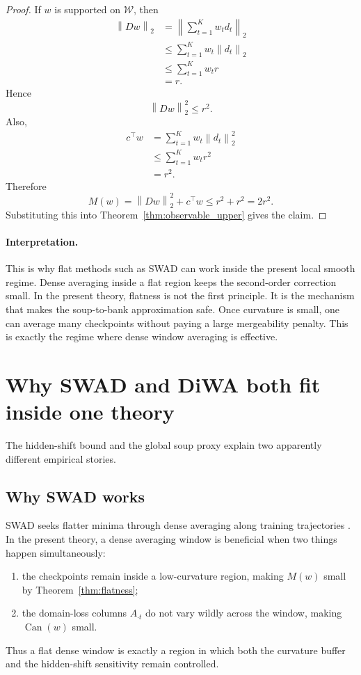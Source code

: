 \documentclass[11pt]{article}
\newcommand{\1}{\mathbf{1}}
\newcommand{\norm}[1]{\left\lVert #1 \right\rVert}
\theoremstyle{plain}
\theoremstyle{definition}
\theoremstyle{remark}
\begin{document}
\begin{proof}
If $w$ is supported on $\mathcal{W}$, then
\begin{align*}
\norm{Dw}_2
&= \norm{\sum_{t=1}^K w_t d_t}_2 \\
&\le \sum_{t=1}^K w_t \norm{d_t}_2 \\
&\le \sum_{t=1}^K w_t r \\
&= r.
\end{align*}
Hence
\[
\norm{Dw}_2^2 \le r^2.
\]
Also,
\begin{align*}
c^\top w
&= \sum_{t=1}^K w_t \norm{d_t}_2^2 \\
&\le \sum_{t=1}^K w_t r^2 \\
&= r^2.
\end{align*}
Therefore
\[
M(w) = \norm{Dw}_2^2 + c^\top w \le r^2 + r^2 = 2r^2.
\]
Substituting this into Theorem~\ref{thm:observable_upper} gives the claim.
\end{proof}

\paragraph{Interpretation.}
This is why flat methods such as SWAD can work inside the present local smooth regime. Dense averaging inside a flat region keeps the second-order correction small. In the present theory, flatness is not the first principle. It is the mechanism that makes the soup-to-bank approximation safe. Once curvature is small, one can average many checkpoints without paying a large mergeability penalty. This is exactly the regime where dense window averaging is effective.

\section{Why SWAD and DiWA both fit inside one theory}
The hidden-shift bound and the global soup proxy explain two apparently different empirical stories.

\subsection*{Why SWAD works}
SWAD seeks flatter minima through dense averaging along training trajectories \cite{cha2021swad}. In the present theory, a dense averaging window is beneficial when two things happen simultaneously:
\begin{enumerate}[leftmargin=1.5em]
    \item the checkpoints remain inside a low-curvature region, making $M(w)$ small by Theorem~\ref{thm:flatness};
    \item the domain-loss columns $A_{\cdot t}$ do not vary wildly across the window, making $\operatorname{Can}(w)$ small.
\end{enumerate}
Thus a flat dense window is exactly a region in which both the curvature buffer and the hidden-shift sensitivity remain controlled.
\end{document}

